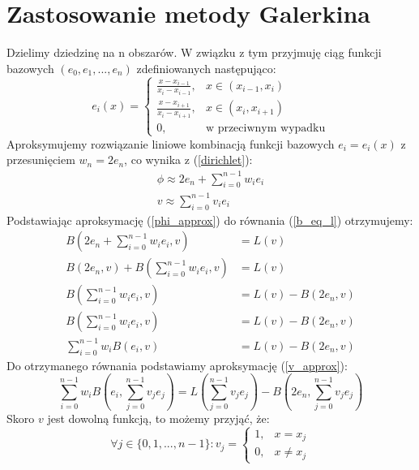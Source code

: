 \documentclass[a4paper,12pt]{article}
\begin{document}
    \section{Zastosowanie metody Galerkina}
    Dzielimy dziedzinę na n obszarów.
    W związku z tym przyjmuję ciąg funkcji bazowych \((e_0, e_1, ..., e_n)\) zdefiniowanych następująco:
    \begin{equation}
        e_i(x) =
        \begin{cases}
            \frac{x-x_{i-1}}{x_i-x_{i-1}},& x \in (x_{i-1}, x_i) \\
            \frac{x-x_{i+1}}{x_i-x_{i+1}},& x \in (x_i, x_{i+1}) \\
            0,& \text{w przeciwnym wypadku}
        \end{cases} \label{e_def}
    \end{equation}
    Aproksymujemy rozwiązanie liniowe kombinacją funkcji bazowych \(e_i = e_i(x)\) z przesunięciem \(w_n = 2e_n\), co wynika z (\ref{dirichlet}):
    \begin{gather}
        \phi \approx 2e_n + \sum_{i=0}^{n-1} w_i e_i \label{phi_approx}\\
        v \approx \sum_{i=0}^{n-1} v_i e_i \label{v_approx}
    \end{gather}
    Podstawiając aproksymację (\ref{phi_approx}) do równania (\ref{b_eq_l}) otrzymujemy:
    \begin{align*}
        B\left(2e_n + \sum_{i=0}^{n-1} w_i e_i, v\right) &= L(v) \\
        B(2e_n, v) + B\left(\sum_{i=0}^{n-1} w_i e_i, v\right) &= L(v) \\
        B\left(\sum_{i=0}^{n-1} w_i e_i, v\right) &= L(v)-B(2e_n, v) \\
        B\left(\sum_{i=0}^{n-1} w_i e_i, v\right) &= L(v)-B(2e_n, v) \\
        \sum_{i=0}^{n-1} w_i B(e_i, v) &= L(v)-B(2e_n, v)
    \end{align*}
    Do otrzymanego równania podstawiamy aproksymację (\ref{v_approx}):
    \begin{equation*}
        \sum_{i=0}^{n-1} w_i B\left(e_i, \sum_{j=0}^{n-1} v_j e_j\right) = L\left(\sum_{j=0}^{n-1} v_j e_j\right)-B\left(2e_n, \sum_{j=0}^{n-1} v_j e_j\right)
    \end{equation*}
    Skoro \(v\) jest dowolną funkcją, to możemy przyjąć, że:
    \begin{equation*}
        \forall j \in \{0,1,...,n-1\}: v_j = 
        \begin{cases}
            1,& x = x_j \\
            0,& x \neq x_j
        \end{cases}
    \end{equation*}
\end{document}

